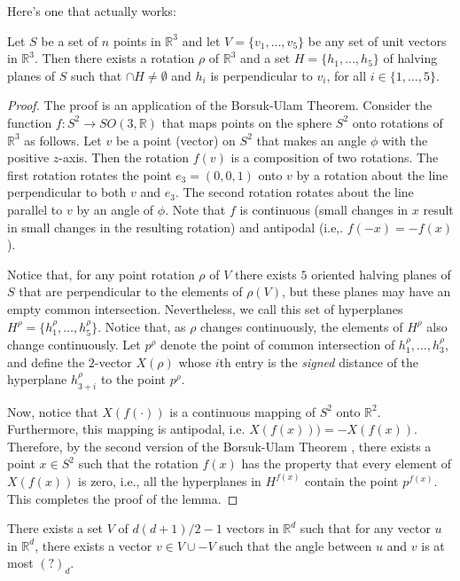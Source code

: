 \documentclass[lotsofwhite]{patmorin}
\newcommand{\crap}[1]{(?)_d}
\newcommand{\nov}{d(d+1)/2-1}
\begin{document}
Here's one that actually works:
\begin{lem}
Let $S$ be a set of $n$ points in $\mathbb{R}^3$ and let 
$V=\{v_1,\ldots,v_5\}$ be any set of unit vectors in $\mathbb{R}^3$.
Then there exists a rotation $\rho$ of $\mathbb{R}^3$ and a set
$H=\{h_1,\ldots,h_5\}$ of halving planes of $S$ such that $\cap
H\neq\emptyset$ and $h_i$ is perpendicular to $v_i$, for all
$i\in\{1,\ldots,5\}$. 
\end{lem}

\begin{proof} 
The proof is an application of the Borsuk-Ulam Theorem.  Consider the
function $f:S^2\rightarrow SO(3,\mathbb{R})$ that maps points on the
sphere $S^2$ onto rotations of $\mathbb{R}^3$ as follows.  Let $v$ be
a point (vector) on $S^2$ that makes an angle $\phi$ with the positive
$z$-axis.  Then the rotation $f(v)$ is a composition of two rotations.
The first rotation rotates the point $e_3=(0,0,1)$ onto $v$ by a
rotation about the line perpendicular to both $v$ and $e_3$.  The
second rotation rotates about the line parallel to $v$ by an angle of
$\phi$.  Note that $f$ is continuous (small changes in $x$ result
in small changes in the resulting rotation) and antipodal (i.e,.
$f(-x)=-f(x)$).  

Notice that, for any point rotation $\rho$ of $V$ there exists $5$
oriented halving planes of $S$ that are perpendicular to the elements
of $\rho(V)$, but these planes may have an empty common intersection.
Nevertheless, we call this set of hyperplanes
$H^\rho=\{h^\rho_1,\ldots,h^\rho_{5}\}$.  Notice that, as $\rho$
changes continuously, the elements of $H^\rho$ also change
continuously.  Let $p^\rho$ denote the point of common intersection of
$h^\rho_1,\ldots,h^\rho_3$, and define the $2$-vector $X(\rho)$ whose
$i$th entry is the \emph{signed} distance of the hyperplane
$h^\rho_{3+i}$ to the point $p^\rho$.  

Now, notice that $X(f(\cdot))$ is a continuous mapping of $S^2$ onto
$\mathbb{R}^{2}$.  Furthermore, this mapping is antipodal, i.e.
$X(f(x))) = -X(f(x))$.  Therefore, by the second version of the
Borsuk-Ulam Theorem \cite[Theorem~2.1.1, version BU1b]{mXX}, there
exists a point $x\in S^2$ such that the rotation $f(x)$ has the
property that every element of $X(f(x))$ is zero, i.e., all the
hyperplanes in $H^{f(x)}$ contain the point $p^{f(x)}$.  This
completes the proof of the lemma.  
\end{proof}


\begin{lem}
There exists a set $V$ of $\nov$ vectors in $\mathbb{R}^d$ such that
for any vector $u$ in $\mathbb{R}^d$, there exists a vector $v\in
V\cup -V$ such that the angle between $u$ and $v$ is at most
$\crap{d}$.  
\end{lem}
\end{document}
